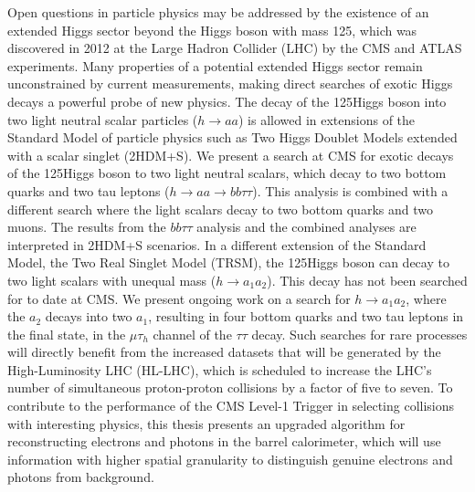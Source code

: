 Open questions in particle physics may be addressed by the existence of an extended Higgs sector beyond the Higgs boson with mass 125\GeV, which was discovered in 2012 at the Large Hadron Collider (LHC) by the CMS and ATLAS experiments. Many properties of a potential extended Higgs sector remain unconstrained by current measurements, making direct searches of exotic Higgs decays a powerful probe of new physics. The decay of the 125\GeV Higgs boson into two light neutral scalar particles ($h\rightarrow aa$) is allowed in extensions of the Standard Model of particle physics such as Two Higgs Doublet Models extended with a scalar singlet (2HDM+S). We present a search at CMS for exotic decays of the 125\GeV Higgs boson to two light neutral scalars, which decay to two bottom quarks and two tau leptons ($h\rightarrow aa \rightarrow bb\tau\tau$). This analysis is combined with a different search where the light scalars decay to two bottom quarks and two muons. The results from the $bb\tau\tau$ analysis and the combined analyses are interpreted in 2HDM+S scenarios. In a different extension of the Standard Model, the Two Real Singlet Model (TRSM), the 125\GeV Higgs boson can decay to two light scalars with unequal mass ($h \rightarrow a_1 a_2$). This decay has not been searched for to date at CMS. We present ongoing work on a search for $h\rightarrow a_1 a_2$, where the $a_2$ decays into two $a_1$, resulting in four bottom quarks and two tau leptons in the final state, in the $\mu\tau_{h}$ channel of the $\tau\tau$ decay. Such searches for rare processes will directly benefit from the increased datasets that will be generated by the High-Luminosity LHC (HL-LHC), which is scheduled to increase the LHC's number of simultaneous proton-proton collisions by a factor of five to seven. To contribute to the performance of the CMS Level-1 Trigger in selecting collisions with interesting physics, this thesis presents an upgraded algorithm for reconstructing electrons and photons in the barrel calorimeter, which will use information with higher spatial granularity to distinguish genuine electrons and photons from background.